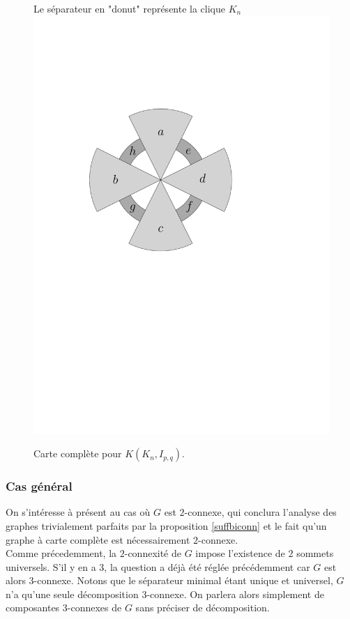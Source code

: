 \documentclass{scrartcl}
\begin{document}
\begin{flushleft}
\begin{figure}[h]
    \caption{Carte complète pour $K(K_n, I_{p,q})$.}\label{KKnIpqmap}
    \begin{center}
        Le séparateur en "donut" représente la clique $K_n$\\
        \includegraphics[page=\ipeFigKKnIpqcompl, scale = 0.4]{figs}
    \end{center}
\end{figure}

\subsubsection{Cas général}

On s'intéresse à présent au cas où $G$ est $2$-connexe, qui conclura l'analyse des graphes trivialement parfaits par la proposition
\ref{suffbiconn} et le fait qu'un graphe à carte complète est nécessairement $2$-connexe.\\
Comme précedemment, la $2$-connexité de $G$ impose l'existence de $2$ sommets universels. S'il y en a $3$, la question
a déjà été réglée précédemment car $G$ est alors $3$-connexe. Notons que le séparateur minimal étant unique et universel,
$G$ n'a qu'une seule décomposition $3$-connexe. On parlera alors simplement de composantes $3$-connexes de $G$ sans préciser
de décomposition.


\end{flushleft}
\end{document}

